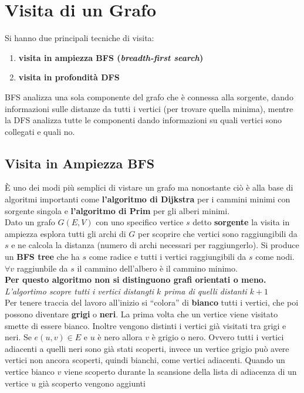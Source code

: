 \documentclass[a4paper,12pt, oneside]{book}
\begin{document}
\section{Visita di un Grafo}
Si hanno due principali tecniche di visita:
\begin{enumerate}
  \item \textbf{visita in ampiezza BFS (\textit{breadth-first search})}
  \item \textbf{visita in profondità DFS}
\end{enumerate}
BFS analizza una sola componente del grafo che è connessa alla
sorgente, dando informazioni sulle distanze da tutti i vertici (per
trovare quella minima), mentre la DFS analizza tutte le componenti
dando informazioni su quali vertici sono collegati e quali no.
\subsection{Visita in Ampiezza BFS}
È uno dei modi più semplici di vistare un grafo ma nonostante ciò è
alla base di algoritmi importanti come \textbf{l'algoritmo di
  Dijkstra} per i cammini minimi con sorgente singola e
\textbf{l'algoritmo di Prim} per gli alberi minimi.\\
Dato un grafo $G(E,V)$ con uno specifico vertice $s$ detto
\textbf{sorgente} la visita in ampiezza esplora tutti gli archi di $G$
per scoprire che vertici sono raggiungibili da $s$ e ne calcola la
distanza (numero di archi necessari per raggiungerlo). Si produce un
\textbf{BFS tree} che ha $s$ come radice e tutti i vertici
raggiungibili da $s$ come nodi. $\forall v$ raggiunbile da $s$ il
cammino dell'albero è il cammino minimo.\\
\textbf{Per questo algoritmo non si distinguono grafi orientati o
  meno.}\\
\textit{L'algortimo scopre tutti i vertici distangti $k$ prima di
  quelli distanti $k+1$}\\
Per tenere traccia del lavoro all'inizio si ``colora'' di
\textbf{bianco} tutti i vertici, che poi possono diventare
\textbf{grigi} o \textbf{neri}. La prima volta che un vertice viene
visitato smette di essere bianco. Inoltre vengono distinti i vertici
già visitati tra grigi e neri. Se $e(u,v)\in E$ e $u$ è nero allora
$v$ è grigio o nero. Ovvero tutti i vertici adiacenti a quelli neri
sono già stati scoperti, invece un vertice grigio può avere vertici
non ancora scoperti, quindi bianchi, come vertici adiacenti. Quando un
vertice bianco $v$ viene scoperto durante la scansione della lista
di adiacenza di un vertice $u$ già scoperto vengono aggiunti
\end{document}
